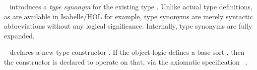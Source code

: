 \begin{isabellebody}
\begin{isamarkuptext}
  \begin{description}

  \item \hyperlink{command.type-synonym}{\mbox{}}~
  introduces a \emph{type synonym}  for the
  existing type .  Unlike actual type definitions, as are
  available in Isabelle/HOL for example, type synonyms are merely
  syntactic abbreviations without any logical significance.
  Internally, type synonyms are fully expanded.
  
  \item \hyperlink{command.typedecl}{\mbox{}}~ declares a new
  type constructor .  If the object-logic defines a base sort
  , then the constructor is declared to operate on that, via
  the axiomatic specification \hyperlink{command.arities}{\mbox{}}~.


\end{description}
\end{isamarkuptext}
\end{isabellebody}
